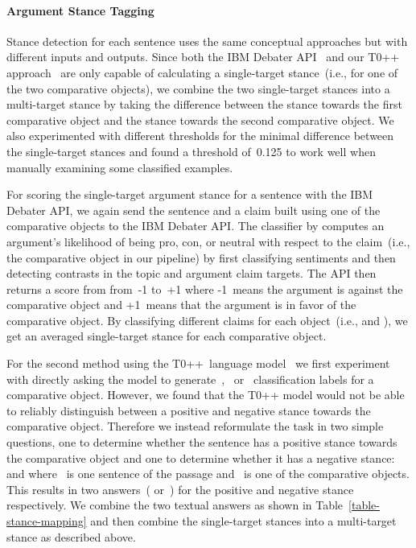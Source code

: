 \paragraph{Argument Stance Tagging}


Stance detection for each sentence uses the same conceptual approaches but with different inputs and outputs.
Since both the IBM Debater API~\cite{BarHaimBDSS2017} and our T0++ approach~\cite{SanhWRBSACSLRDBXTSSKCNDCJWMSYPBWNRSSFFTBGBWR2021} are only capable of calculating a single-target stance~(i.e., for one of the two comparative objects), we combine the two single-target stances into a multi-target stance by taking the difference between the stance towards the first comparative object and the stance towards the second comparative object.
We also experimented with different thresholds for the minimal difference between the single-target stances and found a threshold of~0.125 to work well when manually examining some classified examples.

For scoring the single-target argument stance for a sentence with the IBM Debater API, we again send the sentence and a claim built using one of the comparative objects to the IBM Debater API.
The classifier by \citet{BarHaimBDSS2017} computes an argument's likelihood of being pro, con, or neutral with respect to the claim~(i.e., the comparative object in our pipeline) by first classifying sentiments and then detecting contrasts in the topic and argument claim targets.
The API then returns a score from from~-1 to~+1 where -1~means the argument is against the comparative object and +1~means that the argument is in favor of the comparative object.
By classifying different claims for each object~(i.e.,  and ), we get an averaged single-target stance for each comparative object.

For the second method using the T0++~language model~\cite{SanhWRBSACSLRDBXTSSKCNDCJWMSYPBWNRSSFFTBGBWR2021} we first experiment with directly asking the model to generate~, ~or~ classification labels for a comparative object.
However, we found that the T0++ model would not be able to reliably distinguish between a positive and negative stance towards the comparative object.
Therefore we instead reformulate the task in two simple questions, one to determine whether the sentence has a positive stance towards the comparative object and one to determine whether it has a negative stance:  and  where ~is one sentence of the passage and ~is one of the comparative objects.
This results in two answers~( or~) for the positive and negative stance respectively. We combine the two textual answers as shown in Table~\ref{table-stance-mapping} and then combine the single-target stances into a multi-target stance as described above.

